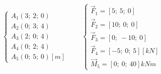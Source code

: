 \begin{equation*}
    \begin{cases}
        A_1(3;\ 2;\ 0) \\
        A_2(0;\ 3;\ 4) \\
        A_3(2;\ 0;\ 4) \\
        A_4( 0;\ 2;\ 4 ) \\
        A_5(0;\ 5;\ 0) [ \si{m} ]
    \end{cases}
    \qquad
    \begin{cases}
        \Vec{F}_1 = [ 5;\ 5;\ 0 ] \\
        \Vec{F}_2 = [ 10;\ 0;\ 0 ] \\
        \Vec{F}_3 = [ 0;\ -10;\ 0 ] \\
        \Vec{F}_4 = [-5;\ 0;\ 5] [ \si{kN} ] \\
        \Vec{M}_5 = [0;\ 0;\ 40] \si{kNm}
    \end{cases}
\end{equation*}
